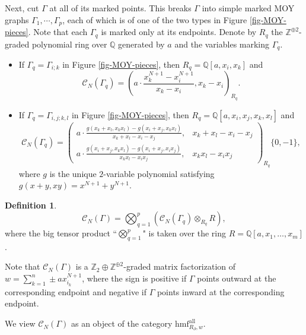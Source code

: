 \documentclass{amsart}
\theoremstyle{plain}
\theoremstyle{definition}
\newtheorem{definition}[theorem]{Definition}
\theoremstyle{remark}
\numberwithin{equation}{section}
\begin{document}
Next, cut $\Gamma$ at all of its marked points. This breaks $\Gamma$ into simple marked MOY graphs $\Gamma_1,\cdots,\Gamma_p$, each of which is of one of the two types in Figure \ref{fig-MOY-pieces}. Note that each $\Gamma_q$ is marked only at its endpoints. Denote by $R_q$ the ${\mathbb{Z}}^{\oplus 2}$-graded polynomial ring over ${\mathbb{Q}}$ generated by $a$ and the variables marking $\Gamma_q$. 

\begin{itemize}
	\item If $\Gamma_q = \Gamma_{i;k}$ in Figure \ref{fig-MOY-pieces}, then $R_q = {\mathbb{Q}}[a,x_i,x_k]$ and 
	\begin{equation}\label{eq-def-mf-arc}
	{\mathcal{C}}_N(\Gamma_q) = (a\cdot\frac{x_k^{N+1}-x_i^{N+1}}{x_k-x_i},x_k-x_i)_{R_q}.
	\end{equation}
	\item If $\Gamma_q = \Gamma_{i,j;k,l}$ in Figure \ref{fig-MOY-pieces}, then $R_q = {\mathbb{Q}}[a,x_i,x_j,x_k,x_l]$ and
	\begin{equation}\label{eq-def-mf-wide-edge}
	{\mathcal{C}}_N(\Gamma_q) = \left(  \begin{array}{cc}
  a\cdot\frac{g(x_k+x_l,x_kx_l)-g(x_i+x_j,x_kx_l)}{x_k+x_l-x_i-x_j}, & x_k+x_l-x_i-x_j \\
  a\cdot\frac{g(x_i+x_j,x_kx_l)-g(x_i+x_j,x_ix_j)}{x_kx_l-x_ix_j}, & x_kx_l-x_ix_j
  \end{array}  \right)_{R_q}\{0,-1\},
	\end{equation}
	where $g$ is the unique $2$-variable polynomial satisfying $g(x+y,xy)=x^{N+1}+y^{N+1}$.
\end{itemize}

\begin{definition}\label{def-mf-MOY}
\[
{\mathcal{C}}_N(\Gamma) = \bigotimes_{q=1}^p ({\mathcal{C}}_N(\Gamma_q) \otimes_{R_q} R),
\]
where the big tensor product ``$\bigotimes_{q=1}^p$" is taken over the ring $R={\mathbb{Q}}[a,x_1,\dots,x_m]$.

Note that ${\mathcal{C}}_N(\Gamma)$ is a ${\mathbb{Z}}_2\oplus{\mathbb{Z}}^{\oplus2}$-graded matrix factorization of $w=\sum_{k=1}^n \pm a x_{i_k}^{N+1}$, where the sign is positive if $\Gamma$ points outward at the corresponding endpoint and negative if $\Gamma$ points inward at the corresponding endpoint. 

We view ${\mathcal{C}}_N(\Gamma)$ as an object of the category ${\mathrm{hmf}}^{\mathrm{all}}_{R_\partial,w}$.
\end{definition}
\end{document}
